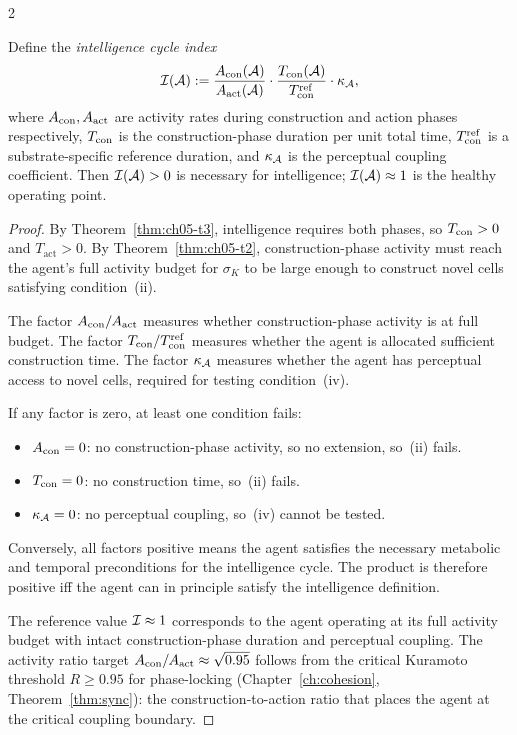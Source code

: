\begin{multicols}{2}
\begin{theorem}\label{thm:ch05-t4}
Define the \emph{intelligence cycle index}
\[
\mathcal{I}(\mathcal{A}) :=
  \frac{A_{\mathrm{con}}(\mathcal{A})}{A_{\mathrm{act}}(\mathcal{A})} \cdot
  \frac{T_{\mathrm{con}}(\mathcal{A})}{T_{\mathrm{con}}^{\mathrm{ref}}} \cdot
  \kappa_{\mathcal{A}},
\]
where $A_{\mathrm{con}}, A_{\mathrm{act}}$ are activity rates during construction and action phases
respectively, $T_{\mathrm{con}}$ is the construction-phase duration per unit total time,
$T_{\mathrm{con}}^{\mathrm{ref}}$ is a substrate-specific reference duration, and $\kappa_{\mathcal{A}}$
is the perceptual coupling coefficient. Then $\mathcal{I}(\mathcal{A}) > 0$ is necessary for
intelligence; $\mathcal{I}(\mathcal{A}) \approx 1$ is the healthy operating point.
\end{theorem}

\begin{proof}
By Theorem~\ref{thm:ch05-t3}, intelligence requires both phases, so $T_{\mathrm{con}} > 0$ and
$T_{\mathrm{act}} > 0$. By Theorem~\ref{thm:ch05-t2}, construction-phase activity must
reach the agent's full activity budget for $\sigma_K$ to be large enough to construct
novel cells satisfying condition~(ii).

The factor $A_{\mathrm{con}}/A_{\mathrm{act}}$ measures whether construction-phase activity is at full budget.
The factor $T_{\mathrm{con}}/T_{\mathrm{con}}^{\mathrm{ref}}$ measures whether the agent is allocated
sufficient construction time. The factor $\kappa_{\mathcal{A}}$ measures whether the agent has
perceptual access to novel cells, required for testing condition~(iv).

If any factor is zero, at least one condition fails:
\begin{itemize}
\item $A_{\mathrm{con}} = 0$: no construction-phase activity, so no extension, so~(ii) fails.
\item $T_{\mathrm{con}} = 0$: no construction time, so~(ii) fails.
\item $\kappa_{\mathcal{A}} = 0$: no perceptual coupling, so~(iv) cannot be tested.
\end{itemize}
Conversely, all factors positive means the agent satisfies the necessary metabolic and
temporal preconditions for the intelligence cycle. The product is therefore positive iff
the agent can in principle satisfy the intelligence definition.

The reference value $\mathcal{I} \approx 1$ corresponds to the agent operating at its full
activity budget with intact construction-phase duration and perceptual coupling. The
activity ratio target $A_{\mathrm{con}}/A_{\mathrm{act}} \approx \sqrt{0.95}$ follows from the critical
Kuramoto threshold $R \ge 0.95$ for phase-locking
(Chapter~\ref{ch:cohesion}, Theorem~\ref{thm:sync}): the construction-to-action ratio
that places the agent at the critical coupling boundary.
\end{proof}


\end{multicols}
